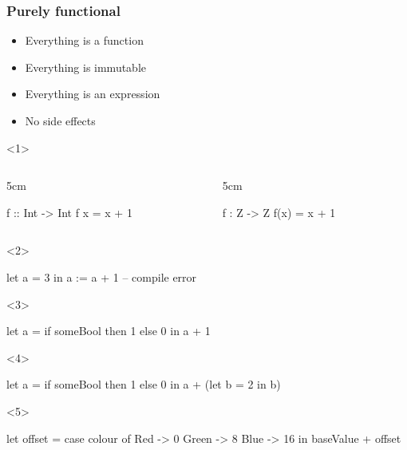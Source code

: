 \documentclass[17pt]{beamer}
\renewcommand{\(}[1]{\begin{columns}[#1]}
\renewcommand{\)}{\end{columns}}
\newcommand{\<}[1]{\begin{column}{#1}}
\renewcommand{\>}{\end{column}}
\begin{document}
\begin{frame}[fragile]
  \frametitle{Purely functional}
  \begin{minipage}[t][.3\textheight]{\textwidth}
  \begin{itemize}
  \item<1-> Everything is a function
  \item<2-> Everything is immutable
  \item<3-> Everything is an expression
  \item<6-> No side effects
  \end{itemize}
  \end{minipage}
  \begin{minipage}[c][.5\textheight]{\textwidth}
  \begin{center}
    \begin{onlyenv}<1>
      \({c}
      \<{5cm}
      \begin{code}
     f :: Int -> Int
     f x = x + 1
      \end{code}
      \>
      \<{5cm}
      \begin{code}
     f : Z -> Z
     f(x) = x + 1
      \end{code}
      \>
      \)
    \end{onlyenv}
    \begin{onlyenv}<2>
      \vfill
      \begin{code}
          let a = 3 in
              a := a + 1 -- compile error
      \end{code}
      \vfill
    \end{onlyenv}
    \begin{onlyenv}<3>
      \begin{code}
          let a = if someBool then 1 else 0 in
              a + 1
      \end{code}
    \end{onlyenv}
    \begin{onlyenv}<4>
      \begin{code}
          let a = if someBool then 1 else 0 in
              a + (let b = 2 in b)
      \end{code}
    \end{onlyenv}
    \begin{onlyenv}<5>
      \begin{code}
              let offset = case colour of
                               Red   ->  0
                               Green ->  8
                               Blue  -> 16
              in baseValue + offset

\end{code}
\end{onlyenv}
\end{center}
\end{minipage}
\end{frame}
\end{document}
